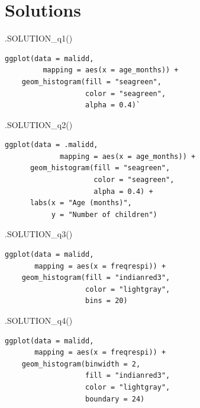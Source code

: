 \documentclass[
  letterpaper,
  DIV=11,
  numbers=noendperiod]{scrreprt}
\newenvironment{Shaded}{\begin{snugshade}}{\end{snugshade}}
\newcommand{\FunctionTok}[1]{\textcolor[rgb]{0.28,0.35,0.67}{#1}}
\newcommand{\NormalTok}[1]{\textcolor[rgb]{0.00,0.23,0.31}{#1}}
\begin{document}
\hypertarget{solutions-3}{%
\section{Solutions}\label{solutions-3}}

\begin{Shaded}
\begin{Highlighting}[]
\FunctionTok{.SOLUTION\_q1}\NormalTok{()}
\end{Highlighting}
\end{Shaded}

\begin{verbatim}
ggplot(data = malidd, 
         mapping = aes(x = age_months)) +
    geom_histogram(fill = "seagreen",
                   color = "seagreen",
                   alpha = 0.4)`
\end{verbatim}

\begin{Shaded}
\begin{Highlighting}[]
\FunctionTok{.SOLUTION\_q2}\NormalTok{()}
\end{Highlighting}
\end{Shaded}

\begin{verbatim}
ggplot(data = .malidd, 
             mapping = aes(x = age_months)) +
      geom_histogram(fill = "seagreen",
                     color = "seagreen",
                     alpha = 0.4) +
      labs(x = "Age (months)",
           y = "Number of children")
\end{verbatim}

\begin{Shaded}
\begin{Highlighting}[]
\FunctionTok{.SOLUTION\_q3}\NormalTok{() }
\end{Highlighting}
\end{Shaded}

\begin{verbatim}
ggplot(data = malidd, 
       mapping = aes(x = freqrespi)) +
    geom_histogram(fill = "indianred3",
                   color = "lightgray",
                   bins = 20)
\end{verbatim}

\begin{Shaded}
\begin{Highlighting}[]
\FunctionTok{.SOLUTION\_q4}\NormalTok{()}
\end{Highlighting}
\end{Shaded}

\begin{verbatim}
ggplot(data = malidd, 
       mapping = aes(x = freqrespi)) +
    geom_histogram(binwidth = 2,
                   fill = "indianred3",
                   color = "lightgray",
                   boundary = 24)
\end{verbatim}
\end{document}
